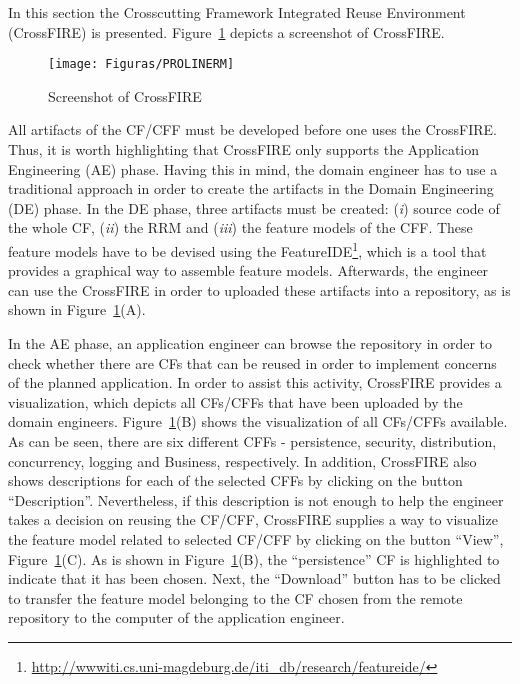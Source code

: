 In this section the Crosscutting Framework Integrated Reuse Environment (CrossFIRE) is presented. Figure~\ref{fig:proline} depicts a screenshot of CrossFIRE.

\begin{figure}[!h]
\centering
 \texttt{[image: Figuras/PROLINERM]}
\caption{Screenshot of CrossFIRE}
\label{fig:proline}
\end{figure}


All artifacts of the CF/CFF must be developed before one uses the CrossFIRE. Thus, it is worth highlighting that CrossFIRE only supports the Application Engineering (AE) phase. Having this in mind, the domain engineer has to use a traditional approach in order to create the artifacts in the Domain Engineering (DE) phase. In the DE phase, three artifacts must be created: (\textit{i}) source code of the whole CF, (\textit{ii}) the RRM and (\textit{iii}) the feature models of the CFF. These feature models have to be devised using the FeatureIDE\footnote{\url{http://wwwiti.cs.uni-magdeburg.de/iti_db/research/featureide/}}, which is a tool that provides a graphical way to assemble feature models. Afterwards, the engineer can use the CrossFIRE in order to uploaded these artifacts into a repository, as is shown in Figure~\ref{fig:proline}(A).    


In the AE phase, an application engineer can browse the repository in order to check whether there are CFs that can be reused in order to implement concerns of the planned application. In order to assist this activity, CrossFIRE provides a visualization, which depicts all CFs/CFFs that have been uploaded by the domain engineers.
Figure~\ref{fig:proline}(B) shows the visualization of all CFs/CFFs available.
As can be seen, there are six different CFFs - persistence, security, distribution, concurrency, logging and 	Business, respectively. 
In addition, CrossFIRE also shows descriptions for each of the selected CFFs by clicking on the button ``Description''. 
Nevertheless, if this description is not enough to help the engineer takes a decision on reusing the CF/CFF, CrossFIRE supplies a way to visualize the feature model related to selected CF/CFF by clicking on the button ``View'', Figure~\ref{fig:proline}(C). 
As is shown in Figure~\ref{fig:proline}(B), the ``persistence'' CF is highlighted to indicate that it has been chosen. 
Next, the ``Download'' button has to be clicked to transfer the feature model belonging to the CF chosen from the remote repository to the computer of the application engineer.

